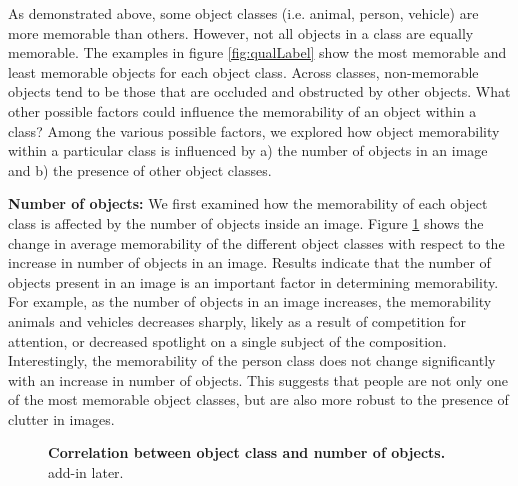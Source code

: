 As demonstrated above, some object classes (i.e. animal, person, vehicle) are more memorable than others. However, not all objects in a class are equally memorable. The examples in figure \ref{fig:qualLabel} show the most memorable and least memorable objects for each object class. Across classes,  non-memorable objects tend to be those that are occluded and obstructed by other objects. What other possible factors could influence the memorability of an object within a class? Among the various possible factors, we explored how object memorability within a particular class is influenced by a) the number of objects in an image and b) the presence of other object classes.

\textbf{Number of objects:} We first examined how the memorability of each object class is affected by the number of objects inside an image. Figure \ref{fig:obLabelChange} shows the change in average memorability of the different object classes with respect to the increase in number of objects in an image. Results indicate that the number of objects present in an image is an important factor in determining memorability. For example, as the number of objects in an image increases, the memorability  animals and vehicles decreases sharply, likely as a result of competition for attention, or decreased spotlight on a single subject of the composition.  Interestingly, the memorability of the person class does not change significantly with an increase in number of objects. This suggests that people are not only one of the most memorable object classes, but are also more robust to the presence of clutter in images.

\begin{figure}[t]
\centering
{}
\vspace{-5mm}\caption{\footnotesize\textbf{Correlation between object class and number of objects.} add-in later. }\label{fig:obLabelChange}
\end{figure}


